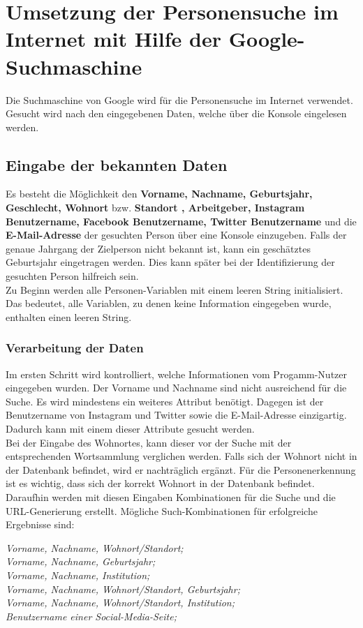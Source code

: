 \section{Umsetzung der Personensuche im Internet mit Hilfe der Google-Suchmaschine}
Die Suchmaschine von Google wird für die Personensuche im Internet verwendet. Gesucht wird nach den eingegebenen Daten, welche über die Konsole eingelesen werden.

	\subsection{Eingabe der bekannten Daten}
	Es besteht die Möglichkeit den \textbf{Vorname, Nachname, Geburtsjahr, Geschlecht, Wohnort} bzw. \textbf{Standort , Arbeitgeber, Instagram Benutzername, Facebook Benutzername, Twitter Benutzername} und die \textbf{E-Mail-Adresse} der gesuchten Person über eine Konsole einzugeben. Falls der genaue Jahrgang der Zielperson nicht bekannt ist, kann ein geschätztes Geburtsjahr eingetragen werden. Dies kann später bei der Identifizierung der gesuchten Person hilfreich sein.\\
	Zu Beginn werden alle Personen-Variablen mit einem leeren String initialisiert. Das bedeutet, alle Variablen, zu denen keine Information eingegeben wurde, enthalten einen leeren String.
	
		\subsubsection{Verarbeitung der Daten}
		Im ersten Schritt wird kontrolliert, welche Informationen vom Progamm-Nutzer eingegeben wurden. Der Vorname und Nachname sind nicht ausreichend für die Suche. Es wird mindestens ein weiteres Attribut benötigt. Dagegen ist der Benutzername von Instagram und Twitter sowie die E-Mail-Adresse einzigartig. Dadurch kann mit einem dieser Attribute gesucht werden.\\
		Bei der Eingabe des Wohnortes, kann dieser vor der Suche mit der entsprechenden Wortsammlung verglichen werden. Falls sich der Wohnort nicht in der Datenbank befindet, wird er nachträglich ergänzt. Für die Personenerkennung ist es wichtig, dass sich der korrekt Wohnort in der Datenbank befindet.\\
		Daraufhin werden mit diesen Eingaben Kombinationen für die Suche und die URL-Generierung erstellt. Mögliche Such-Kombinationen für erfolgreiche Ergebnisse sind:
		
		\textit{Vorname, Nachname, Wohnort/Standort;}\\
		\textit{Vorname, Nachname, Geburtsjahr;}\\
		\textit{Vorname, Nachname, Institution;}\\
		\textit{Vorname, Nachname, Wohnort/Standort, Geburtsjahr;}\\
		\textit{Vorname, Nachname, Wohnort/Standort, Institution;}\\
		\textit{Benutzername einer Social-Media-Seite;}
		
